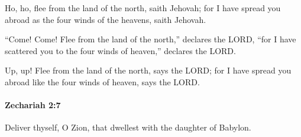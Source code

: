 			\begin{versebox}
					\item[BHS] 
					\item[LXX] 
					\item[ASV] Ho, ho, flee from the land of the north, saith Jehovah; for I have spread you abroad as the four winds of the heavens, saith Jehovah.
					\item[NIV] “Come! Come! Flee from the land of the north,” declares the LORD, “for I have scattered you to the four winds of heaven,” declares the LORD.
					\item[NRSV] Up, up! Flee from the land of the north, says the LORD; for I have spread you abroad like the four winds of heaven, says the LORD.
			\end{versebox}

		\paragraph{Zechariah 2:7} %
			\label{ZECHARIAH-2-7}

			Deliver thyself, O Zion, that dwellest with the daughter of Babylon.

